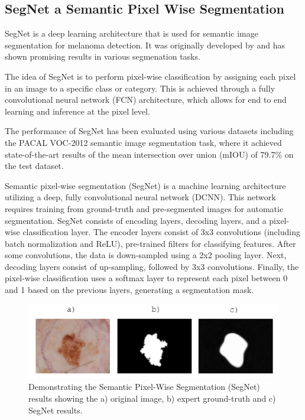 \subsection{SegNet a Semantic Pixel Wise Segmentation}
SegNet is a deep learning architecture that is used for semantic image segmentation for melanoma detection. It was originally developed by\cite{chen2018} and has shown promising results in various segmenation tasks.

The idea of SegNet is to perform pixel-wise classification by assigning each pixel in an image to a specific class or category. This is achieved through a fully convolutional neural network (FCN) architecture, which allows for end to end learning and inference at the pixel level. 

The performance of SegNet has been evaluated using various datasets including the PACAL VOC-2012 semantic image segmentation task, where it achieved state-of-the-art results of the mean intersection over union (mIOU) of 79.7\% on the test dataset.

Semantic pixel-wise segmentation (SegNet) is a machine learning architecture utilizing a deep, fully convolutional neural network (DCNN). This network requires training from ground-truth and pre-segmented images for automatic segmentation. SegNet consists of encoding layers, decoding layers, and a pixel-wise classification layer. The encoder layers consist of 3x3 convolutions (including batch normalization and ReLU), pre-trained filters for classifying features. After some convolutions, the data is down-sampled using a 2x2 pooling layer. Next, decoding layers consist of up-sampling, followed by 3x3 convolutions. Finally, the pixel-wise classification uses a softmax layer to represent each pixel between 0 and 1 based on the previous layers, generating a segmentation mask.

\begin{figure}[hb]
\centering
\includegraphics[scale=1.2]{images/border-seg.png}
\caption{Demonstrating the Semantic Pixel-Wise Segmentation (SegNet) results showing the a) original image, b) expert ground-truth and c) SegNet results.} \label{SegNet}
\end{figure}

